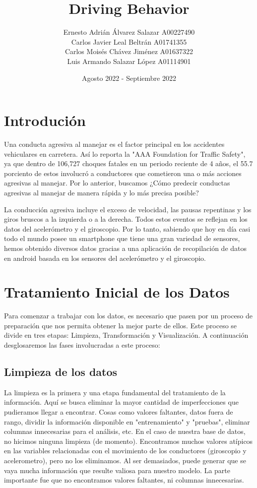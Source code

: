 \documentclass{article}
\title{Driving Behavior}
\author{
Ernesto Adrián Álvarez Salazar  A00227490\\
Carlos Javier Leal Beltrán  A01741355\\
Carlos Moisés Chávez Jiménez  A01637322\\
Luis Armando Salazar López  A01114901\\
}
\date{Agosto 2022 - Septiembre 2022}
\begin{document}
\maketitle

\section{Introdución}
Una conducta agresiva al manejar es el factor principal en los accidentes vehiculares en carretera. Así lo reporta la "AAA Foundation for Traffic Safety", ya que dentro de 106,727 choques fatales en un periodo reciente de 4 años, el 55.7 porciento de estos involucró a conductores que cometieron una o más acciones agresivas al manejar. Por lo anterior, buscamos ¿Cómo predecir conductas agresivas al manejar de manera rápida y lo más precisa posible?

La conducción agresiva incluye el exceso de velocidad, las pausas repentinas y los giros bruscos a la izquierda o a la derecha. Todos estos eventos se reflejan en los datos del acelerómetro y el giroscopio. Por lo tanto, sabiendo que hoy en día casi todo el mundo posee un smartphone que tiene una gran variedad de sensores, hemos obtenido diversos datos gracias a una aplicación de recopilación de datos en android basada en los sensores del acelerómetro y el giroscopio.


\section{Tratamiento Inicial de los Datos}

Para comenzar a trabajar con los datos, es necesario que pasen por un proceso de preparación que nos permita obtener la mejor parte de ellos. Este proceso se divide en tres etapas: Limpieza, Transformación y Visualización. A continuación desglosaremos las fases involucradas a este proceso:

    \subsection{Limpieza de los datos}

        La limpieza es la primera y una etapa fundamental del tratamiento de la información. Aquí se busca eliminar la mayor cantidad de imperfecciones que pudieramos llegar a encontrar. Cosas como valores faltantes, datos fuera de rango, dividir la información disponible en "entrenamiento" y "pruebas", eliminar columnas innecesarias para el análisis, etc.
        En el caso de nuestra base de datos, no hicimos ninguna limpieza (de momento). Encontramos muchos valores atípicos en las variables relacionadas con el movimiento de los conductores (giroscopio y acelerometro), pero no los eliminamos. Al ser demasiados, puede generar que se vaya mucha información que resulte valiosa para nuestro modelo. La parte importante fue que no encontramos valores faltantes, ni columnas innecesarias. \\
\end{document}
